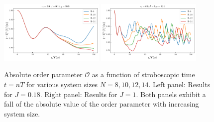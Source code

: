 \documentclass[a4paper, 11pt]{article}
\begin{document}
\begin{figure}[h!]
    \centering
    \includegraphics[width=0.45\textwidth]{figs/order_er0.0_J0.18_g10.0.pdf}
    \includegraphics[width=0.45\textwidth]{figs/order_er0.0_J1_g10.0.pdf}
    \caption{Absolute order parameter $\mathcal{O}$ as a function of stroboscopic time $t=nT$ for various system sizes $N=8,10,12,14$. Left panel: Results for $J = 0.18$. Right panel: Results for $J = 1$. Both panels exhibit a fall of the absolute value of the order parameter with increasing system size.}
\end{figure}
\end{document}
